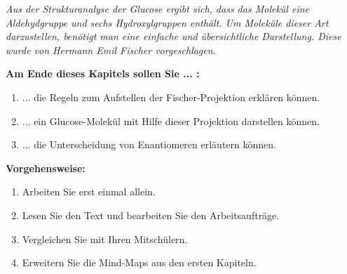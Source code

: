 \documentclass{scrartcl}  %
\begin{document}
		\textit{Aus der Strukturanalyse der Glucose ergibt sich, dass das Molekül eine Aldehydgruppe und sechs Hydroxylgruppen enthält. Um Moleküle dieser Art darzustellen, benötigt man eine einfache und übersichtliche Darstellung. Diese wurde von Hermann Emil Fischer vorgeschlagen. } \newline
	
		\begin{minipage}{0.7\textwidth}
			\noindent \textbf{Am Ende dieses Kapitels sollen Sie ... :}
			\begin{enumerate}
				\item ... die Regeln zum Aufstellen der Fischer-Projektion erklären können.
				\item ... ein Glucose-Molekül mit Hilfe dieser Projektion darstellen können.
				\item ... die Unterscheidung von Enantiomeren erläutern können.
			\end{enumerate}
			\textbf{Vorgehensweise:}
			\begin{enumerate}
				\item Arbeiten Sie erst einmal allein.
				\item Lesen Sie den Text und bearbeiten Sie den Arbeitsaufträge.
				\item Vergleichen Sie mit Ihren Mitschülern.
				\item Erweitern Sie die Mind-Maps aus den ersten Kapiteln. 
			\end{enumerate}
			
		\end{minipage}
		\hspace{0.1\textwidth}
\end{document}
